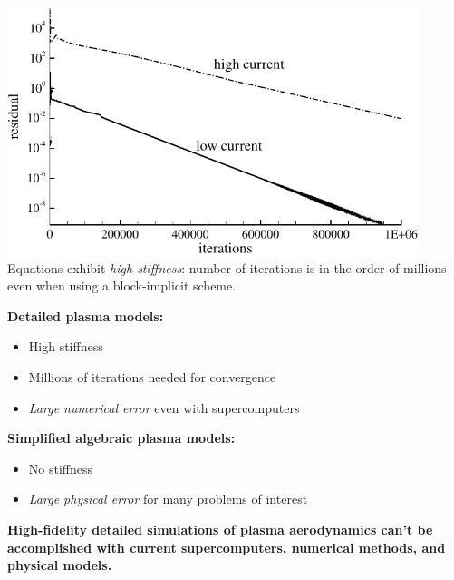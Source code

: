 \documentclass{projector}
\begin{document}
\begin{slide}

\centering
   \includegraphics[width=0.9\textwidth]{case4-case6-ResNe.pdf}
\vfill
\flushleft
Equations exhibit \emph{high stiffness}: number of iterations is in the order of millions even when using a block-implicit scheme.
\end{slide}




\begin{slide}
\vfill
 {\bf Detailed plasma models:} 
         \begin{itemize}
            \item High stiffness
            \item Millions of iterations needed for convergence 
            \item \emph{Large numerical error} even with supercomputers
         \end{itemize} 
\vfill
 {\bf Simplified algebraic plasma models:}
         \begin{itemize}
            \item No stiffness
            \item \emph{Large physical error} for many problems of interest
         \end{itemize}
\vfill
 {\bf High-fidelity detailed simulations of plasma aerodynamics can't be accomplished with current supercomputers, numerical methods, and physical models.}
\vfill
\end{slide}
\end{document}
